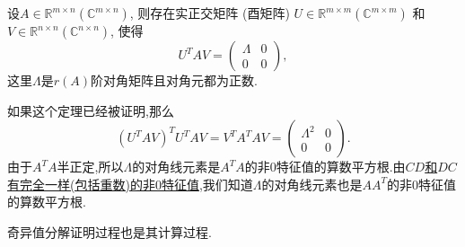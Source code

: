 \documentclass[../../main.tex]{subfiles}
\begin{document}
\begin{theorem}[奇异值分解]\label{theorem:奇异值分解}
设\( A \in \mathbb{R}^{m \times n} (\mathbb{C}^{m \times n}) \), 则存在实正交矩阵 (酉矩阵) \( U \in \mathbb{R}^{m \times m} (\mathbb{C}^{m \times m}) \) 和 \( V \in \mathbb{R}^{n \times n} (\mathbb{C}^{n \times n}) \), 使得
\[
U^T A V = \begin{pmatrix}
\Lambda & 0 \\
0 & 0
\end{pmatrix},
\]
这里\( \Lambda \)是\( r(A) \)阶对角矩阵且对角元都为正数.
\end{theorem}
\begin{note}
如果这个定理已经被证明,那么
\[
(U^T A V)^T U^T A V = V^T A^T A V = \begin{pmatrix}
\Lambda^2 & 0 \\
0 & 0
\end{pmatrix}.
\]
由于\( A^T A \)半正定,所以\( \Lambda \)的对角线元素是\( A^T A \)的非0特征值的算数平方根.由\hyperref[theorem:AB和BA的非0特征值的Jordan块完全一致]{\( CD \)和\( DC \)有完全一样(包括重数)的非0特征值},我们知道\( \Lambda \)的对角线元素也是\( AA^T \)的非0特征值的算数平方根.
\end{note}
\begin{remark}
奇异值分解证明过程也是其计算过程.
\end{remark}
\end{document}
